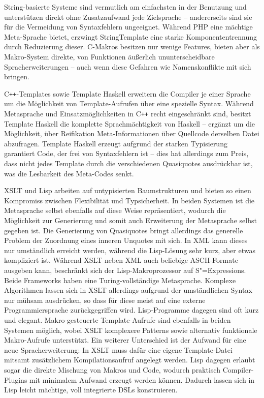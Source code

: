 \documentclass[12pt, a4paper, bibgerm]{scrbook}
\newcommand{\sexps}{S"=Expressions}
\newcommand{\cpp}{C\texttt{++}}
\begin{document}
String-basierte Systeme sind vermutlich am einfachsten in der Benutzung
und unterstützen direkt ohne Zusatzaufwand jede Zielsprache --
andererseits sind sie für die Vermeidung von Syntaxfehlern
ungeeignet. Während PHP eine mächtige Meta-Sprache bietet, erzwingt
StringTemplate eine starke Komponententrennung durch Reduzierung
dieser. C-Makros besitzen nur wenige Features, bieten aber als
Makro-System direkte, von Funktionen äußerlich ununterscheidbare
Spracherweiterungen -- auch wenn diese Gefahren wie Namenskonflikte mit
sich bringen.

\cpp{}-Templates sowie Template Haskell erweitern die Compiler je einer
Sprache um die Möglichkeit von Template-Aufrufen über eine spezielle
Syntax. Während Metasprache und Einsatzmöglichkeiten in \cpp{} recht
eingeschränkt sind, besitzt Template Haskell die komplette Sprachmächtigkeit
von Haskell -- ergänzt um die Möglichkeit, über Reifikation
Meta-Informationen über Quellcode derselben Datei abzufragen. Template
Haskell erzeugt aufgrund der starken Typisierung garantiert Code, der
frei von Syntaxfehlern ist -- dies hat allerdings zum Preis, dass nicht
jedes Template durch die verschiedenen Quasiquotes ausdrückbar ist, was
die Lesbarkeit des Meta-Codes senkt.

XSLT und Lisp arbeiten auf untypisierten Baumstrukturen und bieten so
einen Kompromiss zwischen Flexibilität und Typsicherheit. In beiden
Systemen ist die Metasprache selbst ebenfalls auf diese Weise
repräsentiert, wodurch die Möglichkeit zur Generierung und somit auch
Erweiterung der Metasprache selbst gegeben ist. Die Generierung von
Quasiquotes bringt allerdings das generelle Problem der Zuordnung eines
inneren Unquotes mit sich. In XML kann dieses nur umständlich erreicht
werden, während die Lisp-Lösung sehr kurz, aber etwas kompliziert
ist. Während XSLT neben XML auch beliebige ASCII-Formate ausgeben kann,
beschränkt sich der Lisp-Makroprozessor auf \sexps{}. Beide Frameworks
haben eine Turing-vollständige Metasprache. Komplexe Algorithmen lassen
sich in XSLT allerdings aufgrund der umständlichen Syntax nur mühsam
ausdrücken, so dass für diese meist auf eine externe Programmiersprache
zurückgegriffen wird. Lisp-Programme dagegen sind oft kurz und
elegant. Makro-gesteuerte Template-Aufrufe sind ebenfalls in beiden
Systemen möglich, wobei XSLT komplexere Patterns sowie alternativ
funktionale Makro-Aufrufe unterstützt. Ein weiterer Unterschied ist der
Aufwand für eine neue Spracherweiterung: In XSLT muss dafür eine eigene
Template-Datei mitsamt zusätzlichem Kompilationsaufruf angelegt
werden. Lisp dagegen erlaubt sogar die direkte Mischung von Makros und
Code, wodurch praktisch Compiler-Plugins mit minimalem Aufwand erzeugt
werden können. Dadurch lassen sich in Lisp leicht mächtige, voll
integrierte DSLs konstruieren.
\end{document}
